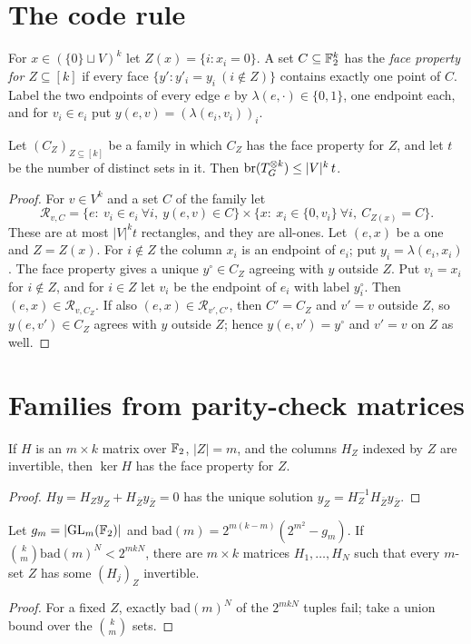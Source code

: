 \section{The code rule}

For $x\in(\{0\}\sqcup V)^k$ let $Z(x)=\{i:x_i=0\}$. A set $C\subseteq\mathbb F_2^k$ has the \emph{face property for $Z\subseteq[k]$} if every face $\{y':y'_i=y_i\ (i\notin Z)\}$ contains exactly one point of $C$. Label the two endpoints of every edge $e$ by $\lambda(e,\cdot)\in\{0,1\}$, one endpoint each, and for $v_i\in e_i$ put $y(e,v)=(\lambda(e_i,v_i))_i$.

\begin{theorem}\label{thm:code}
Let $(C_Z)_{Z\subseteq[k]}$ be a family in which $C_Z$ has the face property for $Z$, and let $t$ be the number of distinct sets in it. Then $\operatorname{br}(T_G^{\otimes k})\le|V|^k\,t$.
\end{theorem}
\begin{proof}
For $v\in V^k$ and a set $C$ of the family let
\[
\mathcal R_{v,C}=\{e:\ v_i\in e_i\ \forall i,\ y(e,v)\in C\}\times\{x:\ x_i\in\{0,v_i\}\ \forall i,\ C_{Z(x)}=C\}.
\]
These are at most $|V|^kt$ rectangles, and they are all-ones. Let $(e,x)$ be a one and $Z=Z(x)$. For $i\notin Z$ the column $x_i$ is an endpoint of $e_i$; put $y_i=\lambda(e_i,x_i)$. The face property gives a unique $y^\circ\in C_Z$ agreeing with $y$ outside $Z$. Put $v_i=x_i$ for $i\notin Z$, and for $i\in Z$ let $v_i$ be the endpoint of $e_i$ with label $y^\circ_i$. Then $(e,x)\in\mathcal R_{v,C_Z}$. If also $(e,x)\in\mathcal R_{v',C'}$, then $C'=C_Z$ and $v'=v$ outside $Z$, so $y(e,v')\in C_Z$ agrees with $y$ outside $Z$; hence $y(e,v')=y^\circ$ and $v'=v$ on $Z$ as well.
\end{proof}

\section{Families from parity-check matrices}

\begin{lemma}\label{lem:ker}
If $H$ is an $m\times k$ matrix over $\mathbb F_2$, $|Z|=m$, and the columns $H_Z$ indexed by $Z$ are invertible, then $\ker H$ has the face property for $Z$.
\end{lemma}
\begin{proof}
$Hy=H_Zy_Z+H_{\bar Z}y_{\bar Z}=0$ has the unique solution $y_Z=H_Z^{-1}H_{\bar Z}y_{\bar Z}$.
\end{proof}

\begin{lemma}\label{lem:count}
Let $g_m=|\mathrm{GL}_m(\mathbb F_2)|$ and $\mathrm{bad}(m)=2^{m(k-m)}(2^{m^2}-g_m)$. If $\binom km\mathrm{bad}(m)^N<2^{mkN}$, there are $m\times k$ matrices $H_1,\dots,H_N$ such that every $m$-set $Z$ has some $(H_j)_Z$ invertible.
\end{lemma}
\begin{proof}
For a fixed $Z$, exactly $\mathrm{bad}(m)^N$ of the $2^{mkN}$ tuples fail; take a union bound over the $\binom km$ sets.
\end{proof}

